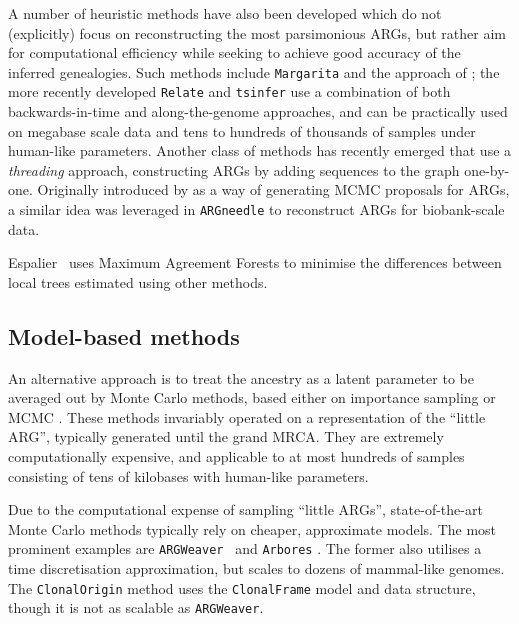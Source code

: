 \documentclass{article}
\begin{document}
A number of heuristic methods have also been developed which do not (explicitly) focus on reconstructing
the most parsimonious ARGs, but rather aim for computational efficiency while seeking to achieve good
accuracy of the inferred genealogies. Such methods include \texttt{Margarita} \citep{minichiello2006mapping}
and the approach of \citet{parida2008estimating}; the more recently developed \texttt{Relate}
\citep{speidel2019method} and \texttt{tsinfer} \citep{kelleher2019inferring} use a combination of both
backwards-in-time and along-the-genome approaches, and can be practically used on megabase scale data
and tens to hundreds of thousands of samples under human-like parameters.
Another class of methods has recently emerged that use a \emph{threading} approach, constructing ARGs
by adding sequences to the graph one-by-one. Originally introduced by \citet{rasmussen2014genome} as a
way of generating MCMC proposals for ARGs, a similar idea was leveraged in \texttt{ARGneedle}
\citep{zhang2021biobank} to reconstruct ARGs for biobank-scale data.


Espalier~\citep{rasmussen2022espalier} uses Maximum Agreement Forests to
minimise the differences between local trees estimated using other methods.

\subsection*{Model-based methods}
An alternative approach is to treat the ancestry as a latent parameter to be averaged out
by Monte Carlo methods, based either on importance sampling
\citep{griffiths1996ancestral, fearnhead2001estimating, jenkins2011inference}
or MCMC \citep{kuhner2000maximum, nielsen2000estimation, wang2008bayesian, fallon2013acg}.
These methods invariably operated on a representation of the ``little ARG'', typically
generated until the grand MRCA. They are extremely computationally expensive,
and applicable to at most hundreds of samples consisting of tens of kilobases with
human-like parameters.

Due to the computational expense of sampling ``little ARGs'', state-of-the-art
Monte Carlo methods typically rely on cheaper, approximate models.
The most prominent examples are
\texttt{ARGWeaver}~\citep{rasmussen2014genome,hubisz2020mapping,hubisz2020inference}
and \texttt{Arbores} \citep{heine2018bridging}. The former also utilises a time
discretisation approximation, but scales to dozens of mammal-like genomes.
The \texttt{ClonalOrigin} method \citep{didelot2010inference,
medina2020speeding} uses the \texttt{ClonalFrame}
model and data structure, though it is not as scalable as \texttt{ARGWeaver}.
\end{document}
